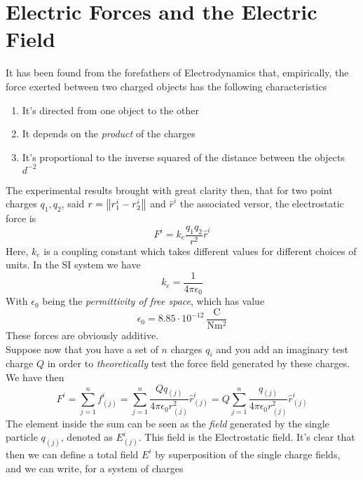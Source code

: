 \documentclass[../electromagnetism]{subfiles}
\begin{document}
\section{Electric Forces and the Electric Field}
It has been found from the forefathers of Electrodynamics that, empirically, the force exerted between two charged objects has the following characteristics
\begin{enumerate}
\item It's directed from one object to the other
\item It depends on the \textit{product} of the charges
\item It's proportional to the inverse squared of the distance between the objects $d^{-2}$
\end{enumerate}
The experimental results brought with great clarity then, that for two point charges $q_1,q_2$, said $r=\norm{r^i_1-r^i_2}$ and $\hat{r}^i$ the associated versor, the electrostatic force is
\begin{equation}
	F^i=k_e\frac{q_1q_2}{r^2}\hat{r}^i
	\label{eq:electrostaticforce}
\end{equation}
Here, $k_e$ is a coupling constant which takes different values for different choices of units. In the SI system we have
\begin{equation}
	k_e=\frac{1}{4\pi\epsilon_0}
	\label{eq:escoupling}
\end{equation}
With $\epsilon_0$ being the \textit{permittivity of free space}, which has value
\begin{equation}
	\epsilon_0=8.85\cdot10^{-12}\ \mathrm{\frac{C}{Nm^2}}
	\label{eq:epsilonnot}
\end{equation}
These forces are obviously additive.\\
Suppose now that you have a set of $n$ charges $q_i$ and you add an imaginary test charge $Q$ in order to \textit{theoretically} test the force field generated by these charges. We have then
\begin{equation}
	F^i=\sum_{j=1}^nf^i_{(j)}=\sum_{j=1}^n\frac{Qq_{(j)}}{4\pi\epsilon_0 r_{(j)}^2}\hat{r}_{(j)}^i=Q\sum_{j=1}^n\frac{q_{(j)}}{4\pi\epsilon_0r_{(j)}^2}\hat{r}^i_{(j)}
	\label{eq:forceonimcharge}
\end{equation}
The element inside the sum can be seen as the \textit{field} generated by the single particle $q_{(j)}$, denoted as $E^i_{(j)}$. This field is the Electrostatic field. It's clear that then we can define a total field $E^i$ by superposition of the single charge fields, and we can write, for a system of charges
\end{document}
